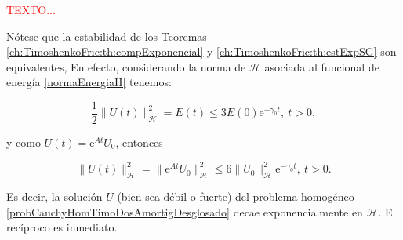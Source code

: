 \textcolor{red}{TEXTO...}

\begin{Observacion}
    \label{ch:TimoshenkoFric:obs:estExpSGyestExpEnergia}

    Nótese que la estabilidad de los Teoremas \ref{ch:TimoshenkoFric:th:compExponencial} y \ref{ch:TimoshenkoFric:th:estExpSG} son equivalentes, En efecto, considerando la norma de $\mathcal{H}$ asociada al funcional de energía \ref{normaEnergiaH} tenemos:

    \[\frac{1}{2}\lVert U(t) \rVert_{\mathcal{H}}^2 = E(t) \leq 3E(0) \mathrm{e}^{-\gamma_0 t}, \ t > 0,\]

    y como $U(t) = \mathrm{e}^{At}U_0$, entonces

    \[\lVert U(t) \rVert_{\mathcal{H}}^2 = \lVert \mathrm{e}^{At} U_0 \rVert_{\mathcal{H}}^2 \leq 6\lVert U_0 \rVert_{\mathcal{H}}^2 \mathrm{e}^{-\gamma_0 t}, \ t > 0.\]

    Es decir, la solución $U$ (bien sea débil o fuerte) del problema homogéneo \eqref{probCauchyHomTimoDosAmortigDesglosado} decae exponencialmente en $\mathcal{H}$. El recíproco es inmediato.
\end{Observacion}